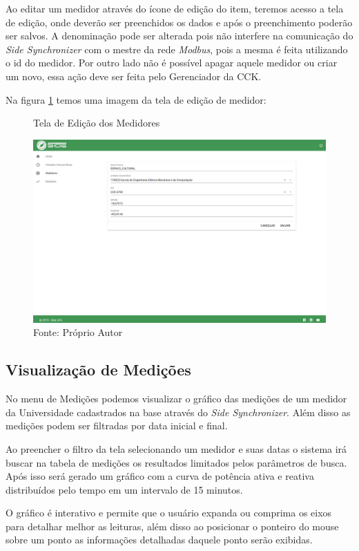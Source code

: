 Ao editar um medidor através do ícone de edição do item, teremos acesso a tela de edição, onde deverão ser preenchidos os dados e após o preenchimento poderão ser salvos. A denominação pode ser alterada pois não interfere na comunicação do \textit{Side Synchronizer} com o mestre da rede \textit{Modbus}, pois a mesma é feita utilizando o id do medidor. Por outro lado não é possível apagar aquele medidor ou criar um novo, essa ação deve ser feita pelo Gerenciador da CCK. 

Na figura \ref{fig:side-medidor-edit} temos uma imagem da tela de edição de medidor:

\begin{figure}[H]
    \centering
    \caption{Tela de Edição dos Medidores}
\includegraphics[width=0.75\linewidth]{imagens/side/side-medidor-edit.png}
    \caption*{Fonte: Próprio Autor}
    \label{fig:side-medidor-edit}
\end{figure}


\subsection{Visualização de Medições}

No menu de Medições podemos visualizar o gráfico das medições de um medidor da Universidade cadastrados na base através do \textit{Side Synchronizer}. Além disso as medições podem ser filtradas por data inicial e final.

Ao preencher o filtro da tela selecionando um medidor e suas datas o sistema irá buscar na tabela de medições os resultados limitados pelos parâmetros de busca. Após isso será gerado um gráfico com a curva de potência ativa e reativa distribuídos pelo tempo em um intervalo de 15 minutos.

O gráfico é interativo e permite que o usuário expanda ou comprima os eixos para detalhar melhor as leituras, além disso ao posicionar o ponteiro do mouse sobre um ponto as informações detalhadas daquele ponto serão exibidas.

